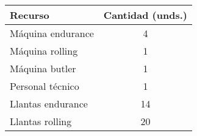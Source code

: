 \documentclass[varwidth=\maxdimen]{standalone}
\begin{document}
\begin{tabular}{ l c }
	\toprule
	Recurso & Cantidad (unds.) \\
	\midrule
	Máquina endurance	& 4 \\
	Máquina rolling		& 1 \\
	Máquina butler		& 1 \\
	Personal técnico	& 1 \\
	Llantas endurance	& 14 \\
	Llantas rolling		& 20 \\
	\bottomrule
\end{tabular}
\end{document}
